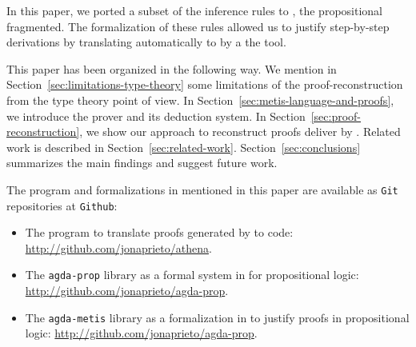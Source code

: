 \documentclass[../main.tex]{subfiles}
\begin{document}




In this paper, we ported a subset of the \Metis inference rules to
\Agda, the propositional fragmented. The formalization of
these rules allowed us to justify step-by-step \Metis derivations by
translating automatically to \Agda by a the \Athena tool.


This paper has been organized in the following way.
We mention in Section~\ref{sec:limitations-type-theory}
some limitations of the proof-reconstruction from the type theory
point of view. In Section~\ref{sec:metis-language-and-proofs}, we introduce the
\Metis prover and its deduction system.
In Section~\ref{sec:proof-reconstruction}, we show our
approach to reconstruct proofs deliver by \Metis.
Related work is described in Section~\ref{sec:related-work}.
Section~\ref{sec:conclusions} summarizes the main findings and suggest future work.


The program and formalizations in \Agda mentioned in this paper are available
as \verb!Git! repositories at \verb!Github!:

\begin{itemize}
  \item The \Athena program to translate proofs generated by \Metis to \Agda code:
  \url{http://github.com/jonaprieto/athena}.
  \item The \verb!agda-prop! library as a formal system in \Agda for propositional logic:
  \url{http://github.com/jonaprieto/agda-prop}.
  \item The \verb!agda-metis! library as a formalization in \Agda to justify \Metis proofs in propositional
  logic:
  \url{http://github.com/jonaprieto/agda-prop}.
\end{itemize}
\end{document}
